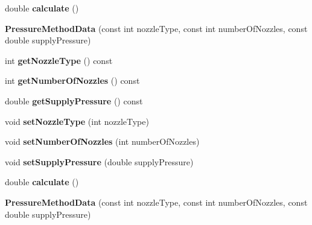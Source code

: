 \begin{DoxyCompactItemize}
double {\bfseries calculate} ()
\item 
\mbox{\label{class_pressure_method_data_ae3f1dfefb362732f0c43fc44a94f7199}} 
{\bfseries Pressure\+Method\+Data} (const int nozzle\+Type, const int number\+Of\+Nozzles, const double supply\+Pressure)
\item 
\mbox{\label{class_pressure_method_data_a8c314e5670651ed22cdc3cd2cbddd23a}} 
int {\bfseries get\+Nozzle\+Type} () const
\item 
\mbox{\label{class_pressure_method_data_acdb45460fa558f7d93b649c5304a8e1c}} 
int {\bfseries get\+Number\+Of\+Nozzles} () const
\item 
\mbox{\label{class_pressure_method_data_a99913643fee384381bd634a14c113d77}} 
double {\bfseries get\+Supply\+Pressure} () const
\item 
\mbox{\label{class_pressure_method_data_a2f6ad84c90de786d6cee92dd89073e5c}} 
void {\bfseries set\+Nozzle\+Type} (int nozzle\+Type)
\item 
\mbox{\label{class_pressure_method_data_ac02b84da973601d4533f40396d3aa8c8}} 
void {\bfseries set\+Number\+Of\+Nozzles} (int number\+Of\+Nozzles)
\item 
\mbox{\label{class_pressure_method_data_a2319ade60f1e688bed667c8bdc969291}} 
void {\bfseries set\+Supply\+Pressure} (double supply\+Pressure)
\item 
\mbox{\label{class_pressure_method_data_a85415f718377f2ee10c1bbd36f4ffef1}} 
double {\bfseries calculate} ()
\item 
\mbox{\label{class_pressure_method_data_ae3f1dfefb362732f0c43fc44a94f7199}} 
{\bfseries Pressure\+Method\+Data} (const int nozzle\+Type, const int number\+Of\+Nozzles, const double supply\+Pressure)
\item 
\mbox{\label{class_pressure_method_data_a8c314e5670651ed22cdc3cd2cbddd23a}} 

\end{DoxyCompactItemize}
